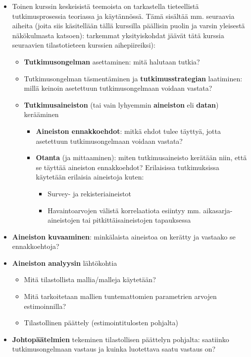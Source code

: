 \documentclass[
]{book}
\providecommand{\tightlist}{%
  \setlength{\itemsep}{0pt}\setlength{\parskip}{0pt}}
\begin{document}
\begin{itemize}
\tightlist
\item
  Toinen kurssin keskeisistä teemoista on tarkastella tieteellistä tutkimusprosessia teoriassa ja käytännössä. Tämä sisältää mm. seuraavia aiheita (joita siis käsitellään tällä kurssilla päällisin puolin ja varsin yleisestä näkökulmasta katsoen): tarkemmat yksityiskohdat jäävät tätä kurssia seuraavien tilastotieteen kurssien aihepiireiksi):

  \begin{itemize}
  \tightlist
  \item
    \textbf{Tutkimusongelman} asettaminen: mitä halutaan tutkia?\\
  \item
    Tutkimusongelman täsmentäminen ja \textbf{tutkimusstrategian} laatiminen: millä keinoin asetettuun tutkimusongelmaan voidaan vastata?
  \item
    \textbf{Tutkimusaineiston} (tai vain lyhyemmin \textbf{aineiston} eli \textbf{datan}) kerääminen

    \begin{itemize}
    \tightlist
    \item
      \textbf{Aineiston ennakkoehdot}: mitkä ehdot tulee täyttyä, jotta asetettuun tutkimusongelmaan voidaan vastata?
    \item
      \textbf{Otanta} (ja mittaaminen): miten tutkimusaineisto kerätään niin, että se täyttää aineiston ennakkoehdot? Erilaisissa tutkimuksissa käytetään erilaisia aineistoja kuten:

      \begin{itemize}
      \tightlist
      \item
        Survey- ja rekisteriaineistot
      \item
        Havaintoarvojen välistä korrelaatiota esiintyy mm. aikasarja-aineistojen tai pitkittäisaineistojen tapauksessa
      \end{itemize}
    \end{itemize}
  \end{itemize}
\item
  \textbf{Aineiston kuvaaminen}: minkälaista aineistoa on kerätty ja vastaako se ennakkoehtoja?
\item
  \textbf{Aineiston analyysin} lähtökohtia

  \begin{itemize}
  \tightlist
  \item
    Mitä tilastollista mallia/malleja käytetään?
  \item
    Mitä tarkoitetaan mallien tuntemattomien parametrien arvojen estimoinnilla?
  \item
    Tilastollinen päättely (estimointitulosten pohjalta)
  \end{itemize}
\item
  \textbf{Johtopäätelmien} tekeminen tilastollisen päättelyn pohjalta: saatiinko tutkimusongelmaan vastaus ja kuinka luotettava saatu vastaus on?
\end{itemize}
\end{document}
